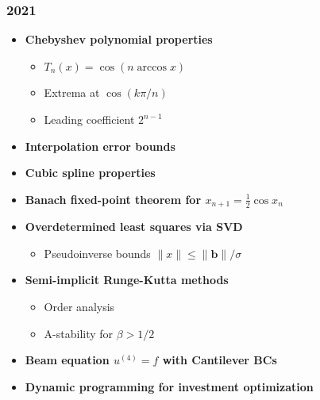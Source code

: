 \subsubsection*{2021}
\begin{itemize}
    \item \textbf{Chebyshev polynomial properties}
        \begin{itemize}
            \item $T_n(x) = \cos(n\arccos x)$
            \item Extrema at $\cos(k\pi/n)$
            \item Leading coefficient $2^{n-1}$
        \end{itemize}
    \item \textbf{Interpolation error bounds}
    \item \textbf{Cubic spline properties}
    \item \textbf{Banach fixed-point theorem for $x_{n+1} = \frac{1}{2}\cos x_n$}
    \item \textbf{Overdetermined least squares via SVD}
        \begin{itemize}
            \item Pseudoinverse bounds $\|x\| \leq \|\mathbf{b}\|/\sigma$
        \end{itemize}
    \item \textbf{Semi-implicit Runge-Kutta methods}
        \begin{itemize}
            \item Order analysis
            \item A-stability for $\beta > 1/2$
        \end{itemize}
    \item \textbf{Beam equation $u^{(4)} = f$ with Cantilever BCs}
    \item \textbf{Dynamic programming for investment optimization}
\end{itemize}

